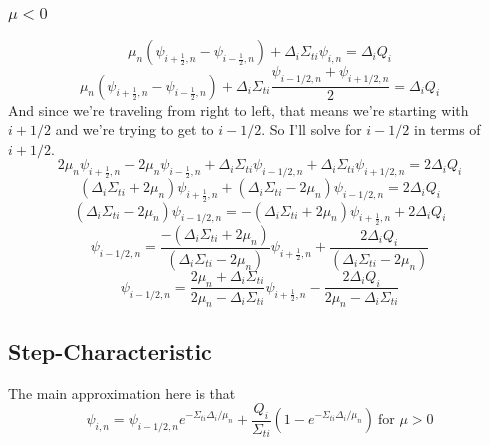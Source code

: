 \documentclass[a4paper]{article}
\begin{document}
 \subsubsection*{$\mu<0$}
\[\mu_n\left(\psi_{i+\frac{1}{2},n}-\psi_{i-\frac{1}{2},n}\right)+\Delta_i\Sigma_{ti}\psi_{i,n}=\Delta_iQ_i\]
\[\mu_n\left(\psi_{i+\frac{1}{2},n}-\psi_{i-\frac{1}{2},n}\right)+\Delta_i\Sigma_{ti}\frac{\psi_{i-1/2,n}+\psi_{i+1/2,n}}{2}=\Delta_iQ_i\]
And since we're traveling from right to left, that means we're starting with $i+1/2$ and we're trying to get to $i-1/2$. So I'll solve for $i-1/2$ in terms of $i+1/2$.
\[2\mu_n\psi_{i+\frac{1}{2},n}-2\mu_n\psi_{i-\frac{1}{2},n}+\Delta_i\Sigma_{ti}\psi_{i-1/2,n}+\Delta_i\Sigma_{ti}\psi_{i+1/2,n}=2\Delta_iQ_i\]
\[(\Delta_i\Sigma_{ti}+2\mu_n)\psi_{i+\frac{1}{2},n}+(\Delta_i\Sigma_{ti}-2\mu_n)\psi_{i-1/2,n}=2\Delta_iQ_i\]
\[(\Delta_i\Sigma_{ti}-2\mu_n)\psi_{i-1/2,n}=-(\Delta_i\Sigma_{ti}+2\mu_n)\psi_{i+\frac{1}{2},n}+2\Delta_iQ_i\]
\[\psi_{i-1/2,n}=\frac{-(\Delta_i\Sigma_{ti}+2\mu_n)}{(\Delta_i\Sigma_{ti}-2\mu_n)}\psi_{i+\frac{1}{2},n}+\frac{2\Delta_iQ_i}{(\Delta_i\Sigma_{ti}-2\mu_n)}\]
\[\boxed{\psi_{i-1/2,n}=\frac{2\mu_n+\Delta_i\Sigma_{ti}}{2\mu_n-\Delta_i\Sigma_{ti}}\psi_{i+\frac{1}{2},n}-\frac{2\Delta_iQ_i}{2\mu_n-\Delta_i\Sigma_{ti}}}\]





 \subsection*{Step-Characteristic}
 The main approximation here is that 
 \[\psi_{i,n}=\psi_{i-1/2,n}e^{-\Sigma_{ti}\Delta_i/\mu_n}+\frac{Q_i}{\Sigma_{ti}}\left(1-e^{-\Sigma_{ti}\Delta_i/\mu_n}\right)~\mbox{for }\mu>0\]
\end{document}

